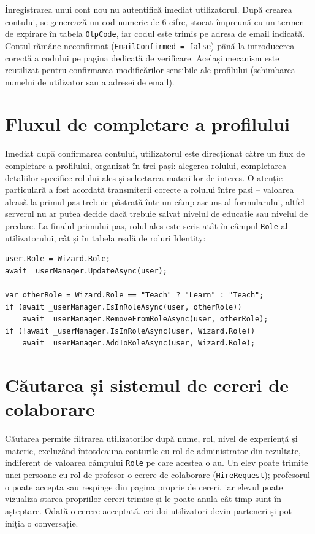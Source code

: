 Înregistrarea unui cont nou nu autentifică imediat utilizatorul. După crearea
contului, se generează un cod numeric de 6 cifre, stocat împreună cu un termen de
expirare în tabela \texttt{OtpCode}, iar codul este trimis pe adresa de email
indicată. Contul rămâne neconfirmat (\texttt{EmailConfirmed = false}) până la
introducerea corectă a codului pe pagina dedicată de verificare. Același mecanism
este reutilizat pentru confirmarea modificărilor sensibile ale profilului
(schimbarea numelui de utilizator sau a adresei de email).

\section{Fluxul de completare a profilului}

Imediat după confirmarea contului, utilizatorul este direcționat către un flux de
completare a profilului, organizat în trei pași: alegerea rolului, completarea
detaliilor specifice rolului ales și selectarea materiilor de interes. O atenție
particulară a fost acordată transmiterii corecte a rolului între pași -- valoarea
aleasă la primul pas trebuie păstrată într-un câmp ascuns al formularului, altfel
serverul nu ar putea decide dacă trebuie salvat nivelul de educație sau nivelul de
predare. La finalul primului pas, rolul ales este scris atât în câmpul
\texttt{Role} al utilizatorului, cât și în tabela reală de roluri Identity:

\begin{lstlisting}[caption={Sincronizarea rolului domeniu cu rolul Identity}]
user.Role = Wizard.Role;
await _userManager.UpdateAsync(user);

var otherRole = Wizard.Role == "Teach" ? "Learn" : "Teach";
if (await _userManager.IsInRoleAsync(user, otherRole))
    await _userManager.RemoveFromRoleAsync(user, otherRole);
if (!await _userManager.IsInRoleAsync(user, Wizard.Role))
    await _userManager.AddToRoleAsync(user, Wizard.Role);
\end{lstlisting}

\section{Căutarea și sistemul de cereri de colaborare}

Căutarea permite filtrarea utilizatorilor după nume, rol, nivel de experiență
și materie, excluzând întotdeauna conturile cu rol de administrator din rezultate,
indiferent de valoarea câmpului \texttt{Role} pe care acestea o au. Un elev poate
trimite unei persoane cu rol de profesor o cerere de colaborare
(\texttt{HireRequest}); profesorul o poate accepta sau respinge din pagina
proprie de cereri, iar elevul poate vizualiza starea propriilor cereri trimise și
le poate anula cât timp sunt în așteptare. Odată o cerere acceptată, cei doi
utilizatori devin parteneri și pot iniția o conversație.


